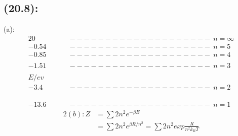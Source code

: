 \begin{latin}
    \section*{(20.8):}
    (a):\\
    \begin{alignat*}{2}
        0 \ & -------------------- \ n = \infty \\
        -0.54 \ & -------------------- \ n = 5 \\
        -0.85 \ & -------------------- \ n = 4 \\\\
        -1.51 \ & -------------------- \ n= 3\\\\
        E/ev \ \ \ \ \ \ \ \ \ \ \ \ \ & \\
        -3.4 \ & -------------------- \ n = 2 \\\\\\\\
        -13.6 \ & -------------------- \ n = 1
    \end{alignat*}
    \begin{alignat*}{2}
        (b):
        Z &= \sum 2n^2 e^{-\beta E} \\
        &= \sum 2n^2 e^{\beta R/n^2} =  \sum 2n^2 exp{\frac{R}{n^{2} k_B T}}\\
    \end{alignat*}
\end{latin}